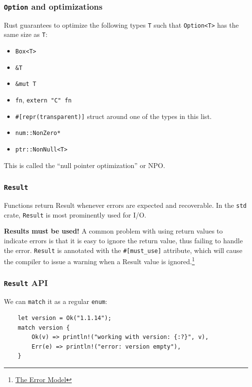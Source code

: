 \documentclass[aspectratio=1610,t]{beamer}
\begin{document}

\begin{frame}[fragile]
\frametitle{\texttt{Option} and optimizations}
Rust guarantees to optimize the following types \texttt{T} such that \texttt{Option<T>} has the same size as \texttt{T}:

\begin{itemize}
    \item \texttt{Box<T>}
    \item \texttt{\&T}
    \item \texttt{\&mut T}
    \item \texttt{fn}, \texttt{extern "C" fn}
    \item \texttt{\#[repr(transparent)]} struct around one of the types in this list.
    \item \texttt{num::NonZero*}
    \item \texttt{ptr::NonNull<T>}
\end{itemize}

This is called the ``null pointer optimization'' or NPO.
\end{frame}


\begin{frame}[fragile]
\frametitle{\texttt{Result}}
Functions return Result whenever errors are expected and recoverable. In the \texttt{std} crate, \texttt{Result} is most prominently used for I/O.

\textbf{Results must be used!} A common problem with using return values to indicate errors is that it is easy to ignore the return value, thus failing to handle the error. \texttt{Result} is annotated with the \texttt{\#[must\_use]} attribute, which will cause the compiler to issue a warning when a Result value is ignored.\footnote{\href{http://joeduffyblog.com/2016/02/07/the-error-model/}{The Error Model}}
\end{frame}


\begin{frame}[fragile]
\frametitle{\texttt{Result} API}
We can \texttt{match} it as a regular \texttt{enum}:

\begin{verbatim}
    let version = Ok("1.1.14");
    match version {
        Ok(v) => println!("working with version: {:?}", v),
        Err(e) => println!("error: version empty"),
    }
\end{verbatim}
\end{frame}
\end{document}

